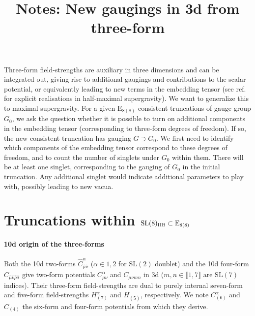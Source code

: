 \documentclass[11pt]{article}
\title{Notes: New gaugings in 3d from three-form}
\author{}
\newcommand{\SL}{\ensuremath{\mathrm{SL}}\xspace}
\newcommand{\E}{\ensuremath{\mathrm{E}}\xspace}
\begin{document}
\maketitle

Three-form field-strengths are auxiliary in three dimensions and can be integrated out, giving rise to additional gaugings and contributions to the scalar potential, or equivalently leading to new terms in the embedding tensor (see ref.~\cite{Deger:2014ofa,Eloy:2021fhc} for explicit realisations in half-maximal supergravity). We want to generalize this to maximal supergravity. For a given $\E_{8(8)}$ consistent truncations of gauge group $G_{0}$, we ask the question whether it is possible to turn on additional components in the embedding tensor (corresponding to three-form degrees of freedom). If so, the new consistent truncation has gauging $G\supset G_{0}$. We first need to identify which components of the embedding tensor correspond to these degrees of freedom, and to count the number of singlets under $G_{0}$ within them. There will be at least one singlet, corresponding to the gauging of $G_{0}$ in the initial truncation. Any additional singlet would indicate additional parameters to play with, possibly leading to new vacua.

\section{Truncations within \texorpdfstring{$\SL(8)_{\rm IIB}\subset\E_{8(8)}$}{SL(8)IIB in E8(8)}}

\paragraph{10d origin of the three-forms} Both the 10d two-forms $\hat{C}_{\hat\mu\hat\nu}^{\alpha}$ ($\alpha\in{1,2}$ for $\SL(2)$ doublet) and the 10d four-form $\hat{C}_{\hat\mu\hat\nu\hat\rho\hat\sigma}$ give two-form potentials $C^{\alpha}_{\mu\nu}$ and $C_{\mu\nu mn}$ in 3d ($m,n\in\llbracket1,7\rrbracket$ are $\SL(7)$ indices). Their three-form field-strengths are dual to purely internal seven-form and five-form field-strengths $H_{(7)}^{\alpha}$ and $H_{(5)}$, respectively. We note $C_{(6)}^{\alpha}$ and $C_{(4)}$ the six-form and four-form potentials from which they derive.
\end{document}
